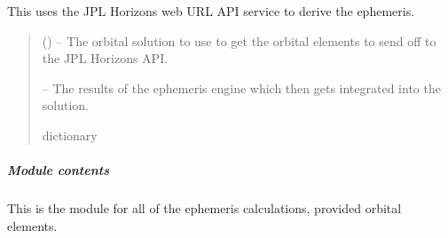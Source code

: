 \documentclass[letterpaper,11pt,english]{sphinxmanual}
\begin{document}

\begin{savenotes}\begin{fulllineitems}
\label{\detokenize{code/opihiexarata.ephemeris.solution:opihiexarata.ephemeris.solution._vehicle_jpl_horizons_web_api}}
\pysigstartsignatures
{}
\pysigstopsignatures
\sphinxAtStartPar
This uses the JPL Horizons web URL API service to derive the ephemeris.
\begin{quote}\begin{description}
\sphinxAtStartPar
{} ({\hyperref[\detokenize{code/opihiexarata.orbit.solution:opihiexarata.orbit.solution.OrbitalSolution}]{}}) – The orbital solution to use to get the orbital elements to send off to
the JPL Horizons API.

\sphinxAtStartPar
{} – The results of the ephemeris engine which then gets integrated into
the solution.

\sphinxAtStartPar
dictionary

\end{description}\end{quote}

\end{fulllineitems}\end{savenotes}



\subparagraph{Module contents}
\label{\detokenize{code/opihiexarata.ephemeris:module-opihiexarata.ephemeris}}\label{\detokenize{code/opihiexarata.ephemeris:module-contents}}
\sphinxAtStartPar
This is the module for all of the ephemeris calculations, provided
orbital elements.
\end{document}

